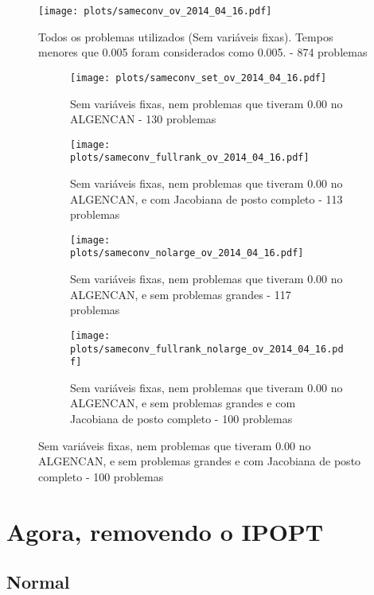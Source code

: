 \documentclass{article}
\begin{document}
\begin{figure}[H]
  \centering
  \texttt{[image: plots/sameconv\_ov\_2014\_04\_16.pdf]}
  \caption{Todos os problemas utilizados (Sem variáveis fixas). Tempos menores
    que 0.005 foram considerados como 0.005. - 874 problemas}
\end{figure}
\begin{figure}[H]
  \centering
  \begin{subfigure}{0.48\textwidth}
    \texttt{[image: plots/sameconv\_set\_ov\_2014\_04\_16.pdf]}
    \caption{Sem variáveis fixas, nem problemas
      que tiveram 0.00 no ALGENCAN - 130 problemas}
  \end{subfigure}
  \begin{subfigure}{0.48\textwidth}
    \texttt{[image: plots/sameconv\_fullrank\_ov\_2014\_04\_16.pdf]}
    \caption{Sem variáveis fixas, nem problemas
      que tiveram 0.00 no ALGENCAN, e com Jacobiana de posto completo - 113
      problemas}
  \end{subfigure}
  \begin{subfigure}{0.48\textwidth}
    \texttt{[image: plots/sameconv\_nolarge\_ov\_2014\_04\_16.pdf]}
    \caption{Sem variáveis fixas, nem problemas
      que tiveram 0.00 no ALGENCAN, e sem problemas grandes - 117 problemas}
  \end{subfigure}
  \begin{subfigure}{0.48\textwidth}
    \texttt{[image: plots/sameconv\_fullrank\_nolarge\_ov\_2014\_04\_16.pdf]}
    \caption{Sem variáveis fixas, nem problemas
      que tiveram 0.00 no ALGENCAN, e sem problemas grandes e com Jacobiana de
      posto completo - 100 problemas}
  \end{subfigure}
\end{figure}

\section{Agora, removendo o IPOPT}

\subsection{Normal}
\end{document}
